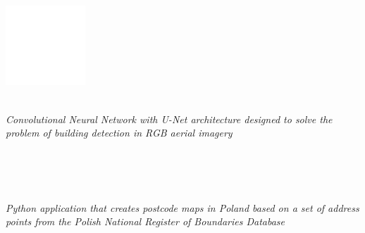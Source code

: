 \documentclass{cls/gml_cv_sets}
\begin{document}
\begin{paracol}{2}

\paracolbackgroundoptions
\footnotesize

{\setasidefontcolour

\vspace{-1em}

\begin{center}
    \includegraphics[height=3cm]{imgs/qr_code.png} \\
\end{center}
\vspace{-1em}

{\small

 \\

\textit{\footnotesize Convolutional Neural Network with U-Net architecture 
designed to solve the problem of building detection in RGB aerial imagery} \\
\vspace{-0.75em}

 \\
 \\ \vspace{0.6em}

 \\ 

\textit{\footnotesize Python application that creates postcode maps in Poland 
based on a set of address points from the Polish National Register of 
Boundaries Database} \\ \vspace{-0.75em}

  \\
  \\ \vspace{0.6em}

}}
\end{paracol}
\end{document}
